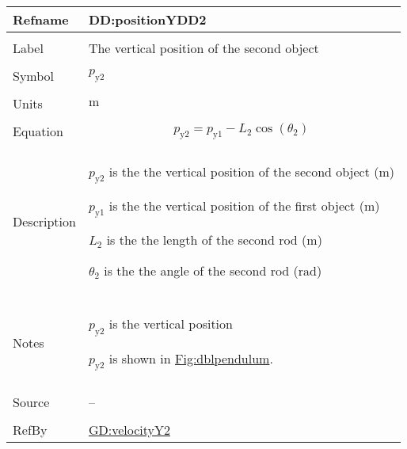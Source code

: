 \documentclass[12pt]{article}
\begin{document}
\vspace{\baselineskip}
\noindent
\begin{minipage}{\textwidth}
\begin{tabular}{>{\raggedright}p{}>{\raggedright\arraybackslash}p{}}
\toprule \textbf{Refname} & \textbf{DD:positionYDD2}
\label{DD:positionYDD2}
\\ \midrule \\
Label & The vertical position of the second object
        
\\ \midrule \\
Symbol & ${p_{\text{y}2}}$
         
\\ \midrule \\
Units & ${\text{m}}$
        
\\ \midrule \\
Equation & \begin{displaymath}
           {p_{\text{y}2}}={p_{\text{y}1}}-{L_{2}} \cos\left({θ_{2}}\right)
           \end{displaymath}
\\ \midrule \\
Description & \begin{symbDescription}
              \item{${p_{\text{y}2}}$ is the the vertical position of the second object (${\text{m}}$)}
              \item{${p_{\text{y}1}}$ is the the vertical position of the first object (${\text{m}}$)}
              \item{${L_{2}}$ is the the length of the second rod (${\text{m}}$)}
              \item{${θ_{2}}$ is the the angle of the second rod (${\text{rad}}$)}
              \end{symbDescription}
\\ \midrule \\
Notes & ${p_{\text{y}2}}$ is the vertical position
        
        ${p_{\text{y}2}}$ is shown in \hyperref[Figure:dblpendulum]{Fig:dblpendulum}.
        
\\ \midrule \\
Source & --
         
\\ \midrule \\
RefBy & \hyperref[GD:velocityY2]{GD:velocityY2}
        
\\ \bottomrule
\end{tabular}
\end{minipage}
\end{document}

